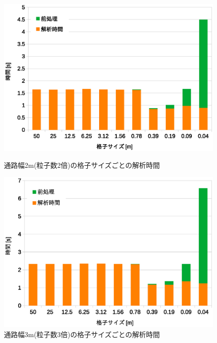 \begin{figure}[tb]
	\begin{minipage}[b]{0.48\columnwidth}
		\begin{center}
		\includegraphics[width=\columnwidth]{figure/5_2bai_jikan.eps}
		\caption{通路幅2m(粒子数2倍)の格子サイズごとの解析時間}
		\label{fig:result_2bai_jikan}
		\end{center}
	\end{minipage}
	\hspace{0.04\columnwidth}
	\begin{minipage}[b]{0.48\columnwidth}
		\begin{center}
		\includegraphics[width=\columnwidth]{figure/5_3bai_jikan.eps}
		\caption{通路幅3m(粒子数3倍)の格子サイズごとの解析時間}
		\label{fig:result_3bai_jikan}
		\end{center}
	\end{minipage}
\end{figure}


